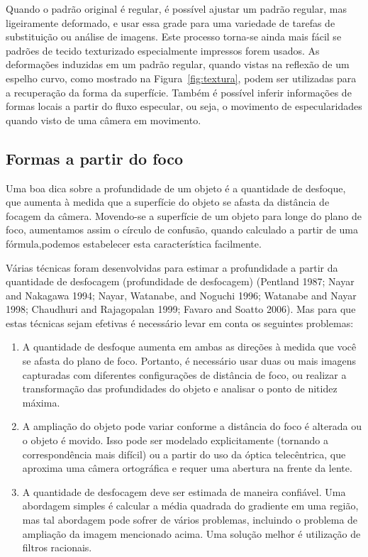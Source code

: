 \documentclass{article}
\begin{document}
Quando o padrão original é regular, é possível ajustar um padrão regular, mas ligeiramente deformado, e usar essa grade para uma variedade de tarefas de substituição ou análise de imagens. Este processo torna-se ainda
mais fácil se padrões de tecido texturizado especialmente impressos forem usados. As deformações induzidas em um padrão regular, quando vistas na reflexão de um espelho curvo, como mostrado na Figura~\ref{fig:textura}, podem ser utilizadas para a recuperação da forma da superfície. Também é possível inferir informações de formas locais a partir do fluxo especular, ou seja, o movimento de especularidades quando visto de uma câmera em movimento.

\subsection{Formas a partir do foco}


Uma boa dica sobre a profundidade de um objeto é a quantidade de desfoque, que aumenta à medida que a superfície do objeto se afasta da distância de focagem da câmera. Movendo-se a superfície de um objeto para longe do plano de foco, aumentamos assim o círculo de confusão, quando calculado a partir de uma fórmula,podemos estabelecer esta característica facilmente.

Várias técnicas foram desenvolvidas para estimar a profundidade a partir da quantidade de desfocagem (profundidade de desfocagem) (Pentland 1987; Nayar and Nakagawa 1994; Nayar, Watanabe,
and Noguchi 1996; Watanabe and Nayar 1998; Chaudhuri and Rajagopalan 1999; Favaro
and Soatto 2006). Mas para que estas técnicas sejam efetivas é necessário levar em conta os seguintes problemas: 

\begin{enumerate}
    \item A quantidade de desfoque aumenta em ambas as direções à medida que você se afasta do plano de foco. Portanto, é necessário usar duas ou mais imagens capturadas com diferentes configurações de distância de foco, ou realizar a transformação das profundidades do objeto e analisar o ponto de nitidez máxima.
    \item A ampliação do objeto pode variar conforme a distância do foco é alterada ou o objeto é movido. Isso pode ser modelado explicitamente (tornando a correspondência mais difícil) ou a partir do uso da óptica telecêntrica, que aproxima uma câmera ortográfica e requer uma abertura na frente da lente.
    \item A quantidade de desfocagem deve ser estimada de maneira confiável. Uma abordagem simples é calcular a média quadrada do gradiente em uma região, mas tal abordagem pode sofrer de vários problemas, incluindo o problema de ampliação da imagem mencionado acima. Uma solução melhor é utilização de filtros racionais.

\end{enumerate}
\end{document}
